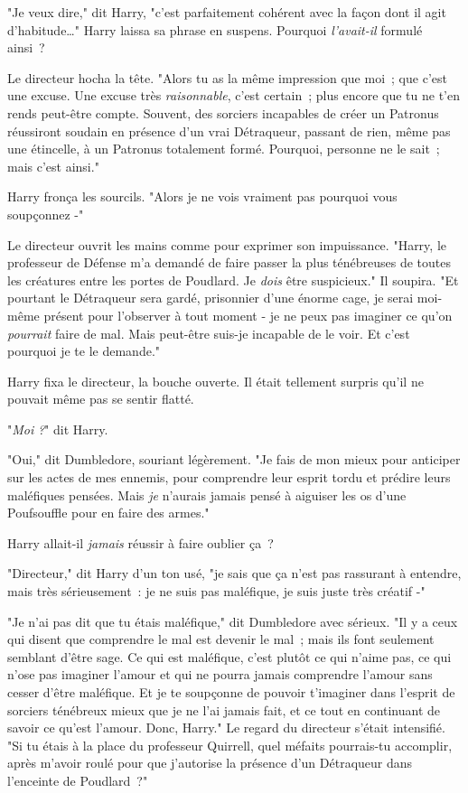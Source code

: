 "Je veux dire," dit Harry, "c'est parfaitement cohérent avec la façon dont il agit d'habitude…" Harry laissa sa phrase en suspens. Pourquoi \emph{l'avait-il} formulé ainsi~?

Le directeur hocha la tête. "Alors tu as la même impression que moi~; que c'est une excuse. Une excuse très \emph{raisonnable}, c'est certain~; plus encore que tu ne t'en rends peut-être compte. Souvent, des sorciers incapables de créer un Patronus réussiront soudain en présence d'un vrai Détraqueur, passant de rien, même pas une étincelle, à un Patronus totalement formé. Pourquoi, personne ne le sait~; mais c'est ainsi."

Harry fronça les sourcils. "Alors je ne vois vraiment pas pourquoi vous soupçonnez -"

Le directeur ouvrit les mains comme pour exprimer son impuissance. "Harry, le professeur de Défense m'a demandé de faire passer la plus ténébreuses de toutes les créatures entre les portes de Poudlard. Je \emph{dois} être suspicieux." Il soupira. "Et pourtant le Détraqueur sera gardé, prisonnier d'une énorme cage, je serai moi-même présent pour l'observer à tout moment - je ne peux pas imaginer ce qu'on \emph{pourrait} faire de mal. Mais peut-être suis-je incapable de le voir. Et c'est pourquoi je te le demande."

Harry fixa le directeur, la bouche ouverte. Il était tellement surpris qu'il ne pouvait même pas se sentir flatté.

"\emph{Moi} \emph{?}" dit Harry.

"Oui," dit Dumbledore, souriant légèrement. "Je fais de mon mieux pour anticiper sur les actes de mes ennemis, pour comprendre leur esprit tordu et prédire leurs maléfiques pensées. Mais \emph{je} n'aurais jamais pensé à aiguiser les os d'une Poufsouffle pour en faire des armes."

Harry allait-il \emph{jamais} réussir à faire oublier ça~?

"Directeur," dit Harry d'un ton usé, "je sais que ça n'est pas rassurant à entendre, mais très sérieusement~: je ne suis pas maléfique, je suis juste très créatif -"

"Je n'ai pas dit que tu étais maléfique," dit Dumbledore avec sérieux. "Il y a ceux qui disent que comprendre le mal est devenir le mal~; mais ils font seulement semblant d'être sage. Ce qui est maléfique, c'est plutôt ce qui n'aime pas, ce qui n'ose pas imaginer l'amour et qui ne pourra jamais comprendre l'amour sans cesser d'être maléfique. Et je te soupçonne de pouvoir t'imaginer dans l'esprit de sorciers ténébreux mieux que je ne l'ai jamais fait, et ce tout en continuant de savoir ce qu'est l'amour. Donc, Harry." Le regard du directeur s'était intensifié. "Si tu étais à la place du professeur Quirrell, quel méfaits pourrais-tu accomplir, après m'avoir roulé pour que j'autorise la présence d'un Détraqueur dans l'enceinte de Poudlard~?"

